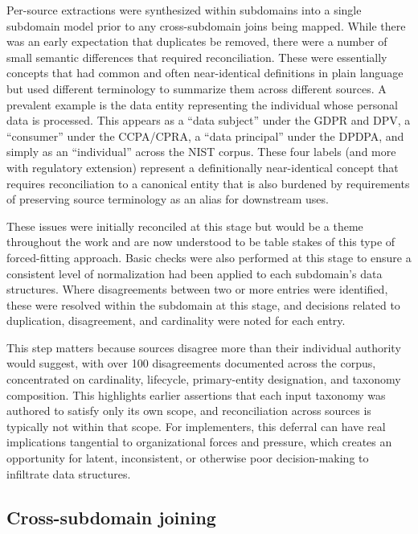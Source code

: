 \documentclass[10pt,letterpaper,twocolumn,twoside]{rho-class/rho}
\begin{document}
Per-source extractions were synthesized within subdomains into a single subdomain model prior to any cross-subdomain joins being mapped. While there was an early expectation that duplicates be removed, there were a number of small semantic differences that required reconciliation. These were essentially concepts that had common and often near-identical definitions in plain language but used different terminology to summarize them across different sources. A prevalent example is the data entity representing the individual whose
personal data is processed. This appears as a ``data subject'' under the
GDPR and DPV, a ``consumer'' under the CCPA/CPRA, a ``data principal''
under the DPDPA, and simply as an ``individual'' across the NIST corpus.
These four labels (and more with regulatory extension) represent a
definitionally near-identical concept that requires reconciliation to a
canonical entity that is also burdened by requirements of preserving
source terminology as an alias for downstream uses.

These issues were initially reconciled at this stage but would be a theme throughout the work and are now understood to be table stakes of this type of forced-fitting approach. Basic checks were also performed at this stage to ensure a consistent level of normalization had been applied to each subdomain's data structures. Where disagreements between two or more entries were identified, these were resolved within the subdomain at this stage, and decisions related to duplication, disagreement, and cardinality were noted for each entry.

This step matters because sources disagree more than their individual authority would suggest, with over 100 disagreements documented across the corpus, concentrated on cardinality, lifecycle, primary-entity designation, and taxonomy composition. This highlights earlier assertions that each input taxonomy was authored to satisfy only its own scope, and reconciliation across sources is typically not within that scope. For implementers, this deferral can have real implications tangential to organizational forces and pressure, which creates an opportunity for latent, inconsistent, or otherwise poor decision-making to infiltrate data structures.

\subsection{Cross-subdomain joining}\label{sec:joining}
\end{document}
